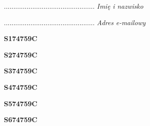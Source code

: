 \begin{turn}{90}\begin{minipage}{\linewidth} \vspace{20mm} ................................................  \textit{Imię i nazwisko}\end{minipage}\end{turn}

\begin{turn}{90}\begin{minipage}{\linewidth} \vspace{20mm} ................................................  \textit{Adres e-mailowy}\end{minipage}\end{turn}

\begin{turn}{90}\huge \begin{minipage}{\linewidth} \vspace{10mm}\textbf{S174759C}\end{minipage}\end{turn}

\begin{turn}{90}\huge \begin{minipage}{\linewidth} \vspace{10mm}\textbf{S274759C}\end{minipage}\end{turn}

\begin{turn}{90}\huge \begin{minipage}{\linewidth} \vspace{10mm}\textbf{S374759C}\end{minipage}\end{turn}

\begin{turn}{90}\huge \begin{minipage}{\linewidth} \vspace{10mm}\textbf{S474759C}\end{minipage}\end{turn}

\begin{turn}{90}\huge \begin{minipage}{\linewidth} \vspace{10mm}\textbf{S574759C}\end{minipage}\end{turn}

\begin{turn}{90}\huge \begin{minipage}{\linewidth} \vspace{10mm}\textbf{S674759C}\end{minipage}\end{turn}

